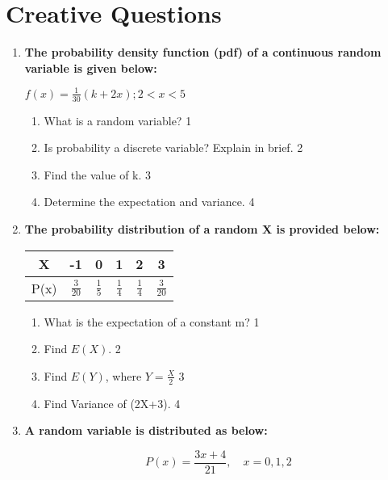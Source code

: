 \documentclass[a4paper,oneside, margin=1.4in]{book}
\begin{document}
\section{Creative Questions}
  \begin{enumerate}
  
         \item \textbf{The probability density function (pdf) of a continuous random variable is given below:}
	  
	  \begin{center}
	  $\displaystyle f(x) = \frac{1}{30} (k+2x); 2 < x < 5$
	  \end{center}
  
  \begin{enumerate}
    \item
    What is a random variable? \hfill 1
    \item
		Is probability a discrete variable? Explain in brief. \hfill 2
    \item  
	Find the value of k.  \hfill 3
    \item
	Determine the expectation and variance. \hfill 4
  \end{enumerate}
  
   \item
	  \textbf{The probability distribution of a random X is provided below:} 
	  
	  \begin{table}[h]
	  \centering
\begin{tabular}{c|ccccc}
X & -1 & 0 & 1 & 2 & 3 \\ \hline
P(x) & $\frac 3{20}$ & $\frac 15$ & $\frac 14$ & $\frac 14$ & $\frac 3{20}$
\end{tabular}
\end{table}
  
  \begin{enumerate}
    \item
	What is the expectation of a constant m? \hfill 1
    \item
	Find $E(X).$ \hfill 2
    \item  
	Find $E(Y)$, where $Y = \frac X2$  \hfill 3
    \item
	Find Variance of (2X+3). \hfill 4
  \end{enumerate}
  
    
        \item \textbf{A random variable is distributed as below:}
        
        \begin{center}
  \textbf{\[
P(x) = \frac{3x + 4}{21}, \quad x = 0, 1, 2
\]
}
  \end{center}


\end{enumerate}
\end{document}
